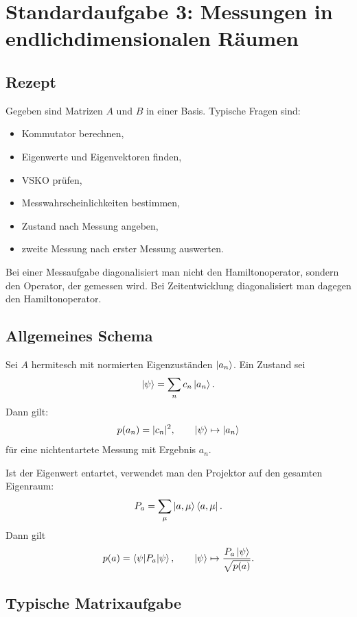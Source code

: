 \section{Standardaufgabe 3: Messungen in endlichdimensionalen Räumen}

\subsection{Rezept}

Gegeben sind Matrizen $A$ und $B$ in einer Basis. Typische Fragen sind:
\begin{itemize}
    \item Kommutator berechnen,
    \item Eigenwerte und Eigenvektoren finden,
    \item VSKO prüfen,
    \item Messwahrscheinlichkeiten bestimmen,
    \item Zustand nach Messung angeben,
    \item zweite Messung nach erster Messung auswerten.
\end{itemize}

\begin{examtipbox}
Bei einer Messaufgabe diagonalisiert man nicht den Hamiltonoperator, sondern den Operator, der gemessen wird. Bei Zeitentwicklung diagonalisiert man dagegen den Hamiltonoperator.
\end{examtipbox}

\subsection{Allgemeines Schema}

Sei $A$ hermitesch mit normierten Eigenzuständen $\left|a_n\right\rangle$. Ein Zustand sei
\[
    \left|\psi\right\rangle=\sum_n c_n\left|a_n\right\rangle.
\]
Dann gilt:
\[
    p(a_n)=|c_n|^2,
    \qquad
    \left|\psi\right\rangle\mapsto \left|a_n\right\rangle
\]
für eine nichtentartete Messung mit Ergebnis $a_n$.

Ist der Eigenwert entartet, verwendet man den Projektor auf den gesamten Eigenraum:
\[
    P_a=\sum_{\mu}\left|a,\mu\right\rangle\left\langle a,\mu\right|.
\]
Dann gilt
\[
    p(a)=\left\langle\psi\middle|P_a\middle|\psi\right\rangle,
    \qquad
    \left|\psi\right\rangle\mapsto \frac{P_a\left|\psi\right\rangle}{\sqrt{p(a)}}.
\]

\subsection{Typische Matrixaufgabe}

